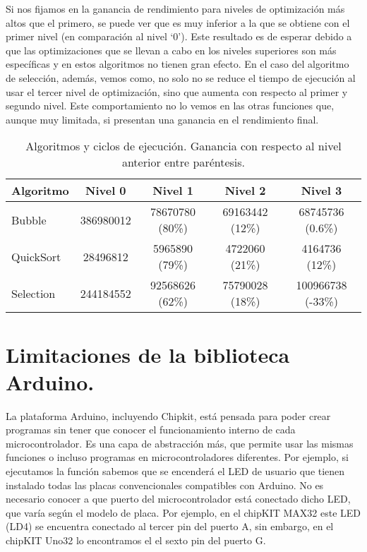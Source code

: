 Si nos fijamos en la ganancia de rendimiento para niveles de optimización más altos que el primero, se puede ver que es muy inferior a la que se obtiene con el primer nivel (en comparación al nivel `0'). Este resultado es de esperar debido a que las optimizaciones que se llevan a cabo en los niveles superiores son más específicas y en estos algoritmos no tienen gran efecto. En el caso del algoritmo de selección, además, vemos como, no solo no se reduce el tiempo de ejecución al usar el tercer nivel de optimización, sino que aumenta con respecto al primer y segundo nivel. Este comportamiento no lo vemos en las otras funciones que, aunque muy limitada, si presentan una ganancia en el rendimiento final.
\begin{table}[htb]
	\begin{center}
		\begin{tabular}{|l|c|c|c|c|}
			\hline
			Algoritmo & Nivel 0 & Nivel 1 & Nivel 2 & Nivel 3 \\
			\hline
			\hline
			Bubble		&	386980012	&	78670780 (80\%)	&	69163442 (12\%)	&	68745736 (0.6\%) \\
			\hline
			QuickSort	&	28496812	&	5965890	(79\%)	&	4722060 (21\%)	&	4164736 (12\%) \\
			\hline
			Selection &	244184552	&	92568626 (62\%)	&	75790028 (18\%)	&	100966738 (-33\%) \\
			\hline
		\end{tabular}
	\end{center}
\caption{Algoritmos y ciclos de ejecución. Ganancia con respecto al nivel anterior entre paréntesis.}
\label{tabla:ciclos}
\end{table}
\section{Limitaciones de la biblioteca Arduino.} %
\label{sec:Limitaciones de la biblioteca Arduino.}

La plataforma Arduino, incluyendo Chipkit, está pensada para poder crear programas sin tener que conocer el funcionamiento interno de cada microcontrolador. Es una capa de abstracción más, que permite usar las mismas funciones o incluso programas en microcontroladores diferentes. Por ejemplo, si ejecutamos la función  sabemos que se encenderá el LED de usuario que tienen instalado todas las placas convencionales compatibles con Arduino. No es necesario conocer a que puerto del microcontrolador está conectado dicho LED, que varía según el modelo de placa. Por ejemplo, en el chipKIT MAX32 este LED (LD4) se encuentra conectado al tercer pin del puerto A, sin embargo, en el chipKIT Uno32 lo encontramos el el sexto pin del puerto G.\@

